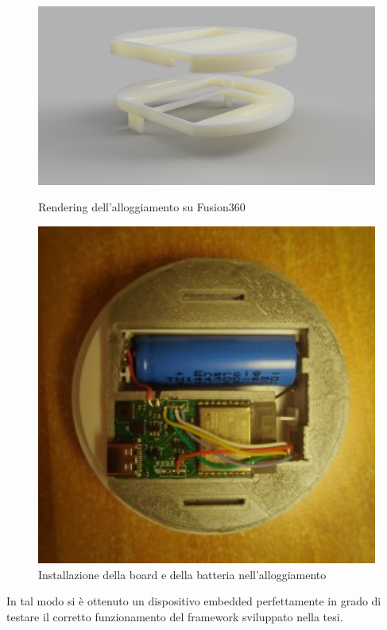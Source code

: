 \begin{figure}[H]
  \centering
  \begin{minipage}[b]{0.68\textwidth}
    \includegraphics[width=1.0\textwidth]{images/chapter2/fusion360.png}
    \caption{Rendering dell'alloggiamento su Fusion360}
    \label{fig:fusion360}
    \end{minipage}
  \hfill
  \begin{minipage}[b]{0.3\textwidth}
    \includegraphics[width=1.0\textwidth]{images/chapter2/step5.jpg}
    \caption{Installazione della board e della batteria nell'alloggiamento}
    \label{fig:step5}  
      \end{minipage}
\end{figure}

In tal modo si è ottenuto un dispositivo embedded perfettamente in grado di testare il corretto funzionamento del framework sviluppato nella tesi.